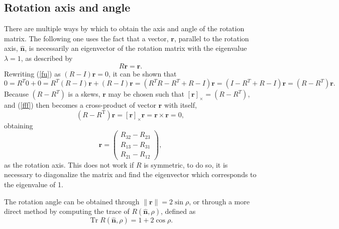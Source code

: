 \subsection{Rotation axis and angle}
There are multiple ways by which to obtain the axis and angle of the rotation matrix. The following one uses the fact that a vector, $\mathbf{r}$, parallel to the rotation axis, $\hat{\mathbf{n}}$, is necessarily an eigenvector of the rotation matrix with the eigenvalue $\lambda = 1$, as described by
\begin{equation}
\label{fu}
R \mathbf{r} = \mathbf{r}.
\end{equation}
Rewriting (\ref{fu}) as $( R - I ) \mathbf{r} = 0$, it can be shown that 
\begin{equation}
\label{fff}
0 = R ^ { T } 0 + 0 = R ^ { T } ( R - I ) \mathbf{r} + ( R - I ) \mathbf{r}  = \left( R ^ { T } R - R ^ { T } + R - I \right) \mathbf{r} = \left( I - R ^ { T } + R - I \right) \mathbf{r} = \left( R - R ^ { T } \right) \mathbf{r}.
\end{equation}
Because $(R - R^T)$ is a \gls{skews}, $\mathbf{r}$ may be chosen such that $[ \mathbf{r} ] _ { \times} = \left( R - R ^ { T } \right)$, and (\ref{fff}) then becomes a cross-product of vector $\mathbf{r}$ with itself,
\begin{equation}
\left( R - R ^ { \mathrm { T } } \right) \mathbf{r} = [ \mathbf{r} ] _ { \times } \mathbf{r} = \mathbf{r} \times \mathbf{r} = 0,
\end{equation}
obtaining
\begin{equation}
\label{gggggg}
\mathbf{r} = \left( \begin{array} { c } { R _ { 32 } - R _ { 23 } } \\ { R _ { 13 } - R _ { 31 } } \\ { R _ { 21 } - R _ { 12 } } \end{array} \right),
\end{equation}
as the rotation axis. This does not work if $R$ is symmetric, to do so, it is necessary to diagonalize the matrix and find the eigenvector which corresponds to the eigenvalue of 1.

The rotation angle can be obtained through $\| \mathbf{r} \| = 2 \sin \rho$, or through a more direct method by computing the trace of $R(\hat{\mathbf{n}}, \rho)$, defined as
\begin{equation}
\operatorname { Tr } R ( \hat { \mathbf{n} } , \rho ) = 1 + 2 \cos \rho.
\end{equation}


